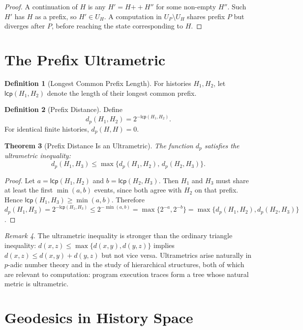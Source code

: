 \documentclass[12pt, a4paper, openany]{book}
\theoremstyle{plain}
\newtheorem{theorem}{Theorem}[chapter]
\theoremstyle{definition}
\newtheorem{definition}[theorem]{Definition}
\theoremstyle{remark}
\newtheorem{remark}[theorem]{Remark}
\begin{document}
\begin{proof}
A continuation of $H$ is any $H' = H \mathbin{++} H''$ for some non-empty $H''$.
Such $H'$ has $H$ as a prefix, so $H' \in U_H$. A computation in $U_P \setminus U_H$
shares prefix $P$ but diverges after $P$, before reaching the state corresponding
to $H$.
\end{proof}

\section{The Prefix Ultrametric}

\begin{definition}[Longest Common Prefix Length]
For histories $H_1, H_2$, let $\mathsf{lcp}(H_1, H_2)$ denote the length of
their longest common prefix.
\end{definition}

\begin{definition}[Prefix Distance]
Define
\[
d_p(H_1, H_2) = 2^{-\mathsf{lcp}(H_1, H_2)}.
\]
For identical finite histories, $d_p(H, H) = 0$.
\end{definition}

\begin{theorem}[Prefix Distance Is an Ultrametric]
The function $d_p$ satisfies the ultrametric inequality:
\[
d_p(H_1, H_3) \leq \max\{d_p(H_1, H_2),\, d_p(H_2, H_3)\}.
\]
\end{theorem}

\begin{proof}
Let $a = \mathsf{lcp}(H_1, H_2)$ and $b = \mathsf{lcp}(H_2, H_3)$.
Then $H_1$ and $H_3$ must share at least the first $\min(a, b)$ events,
since both agree with $H_2$ on that prefix. Hence
$\mathsf{lcp}(H_1, H_3) \geq \min(a, b)$. Therefore
$d_p(H_1, H_3) = 2^{-\mathsf{lcp}(H_1,H_3)} \leq 2^{-\min(a,b)} = \max\{2^{-a}, 2^{-b}\} = \max\{d_p(H_1,H_2), d_p(H_2,H_3)\}$.
\end{proof}

\begin{remark}
The ultrametric inequality is stronger than the ordinary triangle inequality:
$d(x,z) \leq \max\{d(x,y), d(y,z)\}$ implies $d(x,z) \leq d(x,y) + d(y,z)$
but not vice versa. Ultrametrics arise naturally in $p$-adic number theory
and in the study of hierarchical structures, both of which are relevant to
computation: program execution traces form a tree whose natural metric is
ultrametric.
\end{remark}

\section{Geodesics in History Space}
\end{document}

